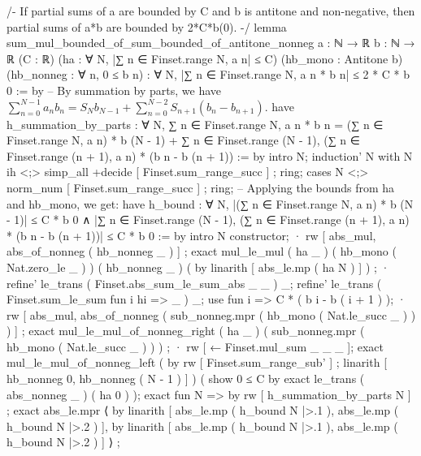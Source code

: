 /-
If partial sums of a are bounded by C and b is antitone and non-negative, then partial sums of a*b are bounded by 2*C*b(0).
-/
lemma sum_mul_bounded_of_sum_bounded_of_antitone_nonneg {a : ℕ → ℝ} {b : ℕ → ℝ} (C : ℝ)
  (ha : ∀ N, |∑ n ∈ Finset.range N, a n| ≤ C)
  (hb_mono : Antitone b) (hb_nonneg : ∀ n, 0 ≤ b n) :
  ∀ N, |∑ n ∈ Finset.range N, a n * b n| ≤ 2 * C * b 0 := by
    -- By summation by parts, we have $\sum_{n=0}^{N-1} a_n b_n = S_N b_{N-1} + \sum_{n=0}^{N-2} S_{n+1} (b_n - b_{n+1})$.
    have h_summation_by_parts : ∀ N, ∑ n ∈ Finset.range N, a n * b n = (∑ n ∈ Finset.range N, a n) * b (N - 1) + ∑ n ∈ Finset.range (N - 1), (∑ n ∈ Finset.range (n + 1), a n) * (b n - b (n + 1)) := by
      intro N; induction' N with N ih <;> simp_all +decide [ Finset.sum_range_succ ] ; ring;
      cases N <;> norm_num [ Finset.sum_range_succ ] ; ring;
    -- Applying the bounds from ha and hb_mono, we get:
    have h_bound : ∀ N, |(∑ n ∈ Finset.range N, a n) * b (N - 1)| ≤ C * b 0 ∧ |∑ n ∈ Finset.range (N - 1), (∑ n ∈ Finset.range (n + 1), a n) * (b n - b (n + 1))| ≤ C * b 0 := by
      intro N
      constructor;
      · rw [ abs_mul, abs_of_nonneg ( hb_nonneg _ ) ] ; exact mul_le_mul ( ha _ ) ( hb_mono ( Nat.zero_le _ ) ) ( hb_nonneg _ ) ( by linarith [ abs_le.mp ( ha N ) ] ) ;
      · refine' le_trans ( Finset.abs_sum_le_sum_abs _ _ ) _;
        refine' le_trans ( Finset.sum_le_sum fun i hi => _ ) _;
        use fun i => C * ( b i - b ( i + 1 ) );
        · rw [ abs_mul, abs_of_nonneg ( sub_nonneg.mpr ( hb_mono ( Nat.le_succ _ ) ) ) ] ; exact mul_le_mul_of_nonneg_right ( ha _ ) ( sub_nonneg.mpr ( hb_mono ( Nat.le_succ _ ) ) ) ;
        · rw [ ← Finset.mul_sum _ _ _ ];
          exact mul_le_mul_of_nonneg_left ( by rw [ Finset.sum_range_sub' ] ; linarith [ hb_nonneg 0, hb_nonneg ( N - 1 ) ] ) ( show 0 ≤ C by exact le_trans ( abs_nonneg _ ) ( ha 0 ) );
    exact fun N => by rw [ h_summation_by_parts N ] ; exact abs_le.mpr ⟨ by linarith [ abs_le.mp ( h_bound N |>.1 ), abs_le.mp ( h_bound N |>.2 ) ], by linarith [ abs_le.mp ( h_bound N |>.1 ), abs_le.mp ( h_bound N |>.2 ) ] ⟩ ;

